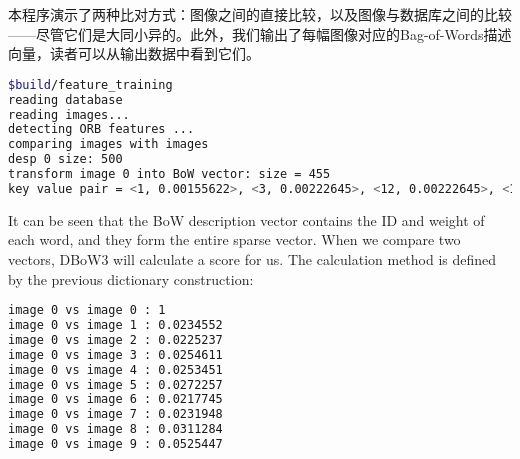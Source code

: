本程序演示了两种比对方式：图像之间的直接比较，以及图像与数据库之间的比较——尽管它们是大同小异的。此外，我们输出了每幅图像对应的Bag-of-Words描述向量，读者可以从输出数据中看到它们。

\begin{lstlisting}[language=sh,caption=终端输出：]
$build/feature_training
reading database
reading images... 
detecting ORB features ... 
comparing images with images 
desp 0 size: 500
transform image 0 into BoW vector: size = 455
key value pair = <1, 0.00155622>, <3, 0.00222645>, <12, 0.00222645>, <13, 0.00222645>, <14, 0.00222645>, <22, 0.00222645>, <33, 0.00222645>, <37, 0.00155622>, <38, 0.00222645>, <39, 0.00222645>, <43, 0.00222645>, <57, 0.00155622> ......
\end{lstlisting}

It can be seen that the BoW description vector contains the ID and weight of each word, and they form the entire sparse vector. When we compare two vectors, DBoW3 will calculate a score for us. The calculation method is defined by the previous dictionary construction:

\begin{lstlisting}[language = sh, caption = Terminal output:]
image 0 vs image 0 : 1
image 0 vs image 1 : 0.0234552
image 0 vs image 2 : 0.0225237
image 0 vs image 3 : 0.0254611
image 0 vs image 4 : 0.0253451
image 0 vs image 5 : 0.0272257
image 0 vs image 6 : 0.0217745
image 0 vs image 7 : 0.0231948
image 0 vs image 8 : 0.0311284
image 0 vs image 9 : 0.0525447
\end{lstlisting}

